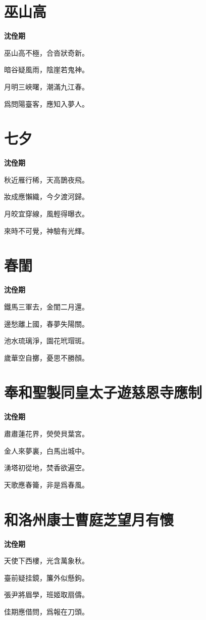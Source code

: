 \documentclass[12pt,a4paper]{ctexbook}
\begin{document}
\section{巫山高}
\textbf{沈佺期}\par\vspace{0.5em}
巫山高不極，合沓狀奇新。\par
暗谷疑風雨，陰崖若鬼神。\par
月明三峽曙，潮滿九江春。\par
爲問陽臺客，應知入夢人。\par

\section{七夕}
\textbf{沈佺期}\par\vspace{0.5em}
秋近雁行稀，天高鵲夜飛。\par
妝成應懶織，今夕渡河歸。\par
月皎宜穿線，風輕得曝衣。\par
來時不可覺，神驗有光輝。\par

\section{春閨}
\textbf{沈佺期}\par\vspace{0.5em}
鐵馬三軍去，金閨二月還。\par
邊愁離上國，春夢失陽關。\par
池水琉璃淨，園花玳瑁斑。\par
歲華空自擲，憂思不勝顏。\par

\section{奉和聖製同皇太子遊慈恩寺應制}
\textbf{沈佺期}\par\vspace{0.5em}
肅肅蓮花界，熒熒貝葉宮。\par
金人來夢裏，白馬出城中。\par
湧塔初從地，焚香欲遍空。\par
天歌應春籥，非是爲春風。\par

\section{和洛州康士曹庭芝望月有懷}
\textbf{沈佺期}\par\vspace{0.5em}
天使下西樓，光含萬象秋。\par
臺前疑挂鏡，簾外似懸鉤。\par
張尹將眉學，班姬取扇儔。\par
佳期應借問，爲報在刀頭。\par
\end{document}
